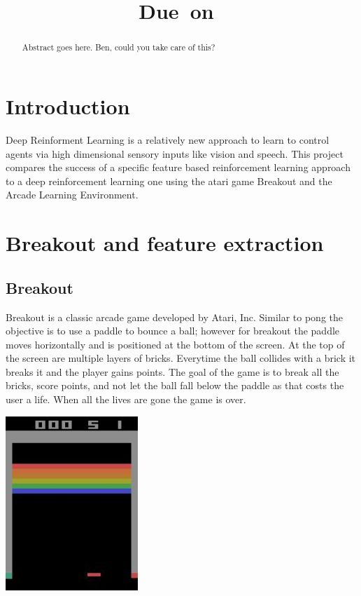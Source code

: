 \documentclass{article}
\title{
    \vspace{2in}
    \textmd{\textbf{\hmwkTitle}}\\
    \normalsize\vspace{0.1in}\small{Due\ on\ \hmwkDueDate}\\
    \vspace{0.1in}\large{\textit{\hmwkClassInstructor}}
    \vspace{3in}
}
\author{\textbf{\hmwkAuthorName}}
\date{}
\begin{document}
\maketitle

\pagebreak

\begin{abstract}
  Abstract goes here. Ben, could you take care of this?
\end{abstract}

\section{Introduction}
Deep Reinforment Learning is a relatively new approach to learn to control agents via high dimensional sensory inputs like vision and speech. This project compares the success of a specific feature based reinforcement learning approach to a deep reinforcement learning one using the atari game Breakout and the Arcade Learning Environment.

\section{Breakout and feature extraction}
\subsection{Breakout}
Breakout is a classic arcade game developed by Atari, Inc. Similar to pong the objective is to use a paddle to bounce a ball; however for breakout the paddle moves horizontally and is positioned at the bottom of the screen. At the top of the screen are multiple layers of bricks. Everytime the ball collides with a brick it breaks it and the player gains points. The goal of the game is to break all the bricks, score points, and not let the ball fall below the paddle as that costs the user a life. When all the lives are gone the game is over.

  \begin{center}
  \includegraphics[width=50mm]{tmp.jpg}
  \end{center}
\end{document}

